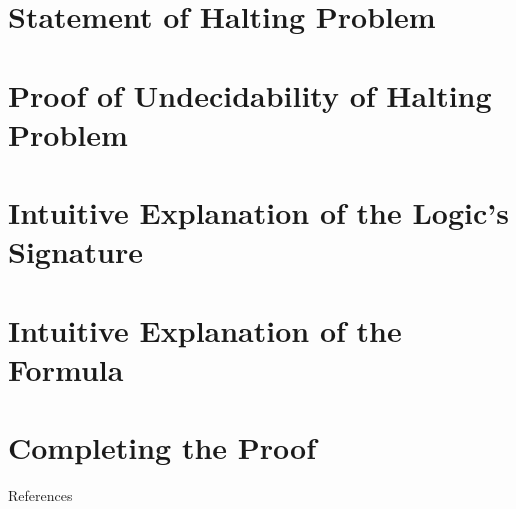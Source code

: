 \documentclass[
11pt,notheorems,hyperref={pdfauthor=whatever}
]{beamer}
\begin{document}

\section{Statement of Halting Problem}
\begin{frame}
\end{frame}

\section{Proof of Undecidability of Halting Problem}
\begin{frame}
\end{frame}


\section{Intuitive Explanation of the Logic's Signature}
\begin{frame}
\end{frame}

\section{Intuitive Explanation of the Formula}
\begin{frame}
\end{frame}

\section{Completing the Proof}
\begin{frame}
\end{frame}

\begin{frame}[allowframebreaks]{References}
    \printbibliography
\end{frame}
\end{document}
